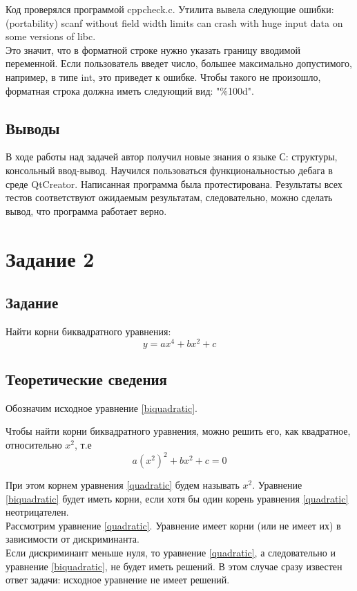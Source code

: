 \documentclass[12pt,a4paper]{report}
\begin{document}
Код проверялся программой cppcheck.c. Утилита вывела следующие ошибки: \\
(portability) scanf without field width limits can crash with huge input data on some versions of libc.\\
Это значит, что в форматной строке нужно указать границу вводимой переменной. Если пользователь введет число, большее максимально допустимого, например, в типе int, это приведет к ошибке. Чтобы такого не произошло, форматная строка должна иметь следующий вид: "\%100d".
\subsection{Выводы}
В ходе работы над задачей автор получил новые знания о языке С: структуры, консольный ввод-вывод. Научился пользоваться функциональностью дебага в среде QtCreator. Написанная программа была протестирована. Результаты всех тестов соответствуют ожидаемым результатам, следовательно, можно сделать вывод, что программа работает верно. 

\section{Задание 2}
\subsection{Задание}
Найти корни биквадратного уравнения: 
\begin{equation}
\label{biquadratic}
y = ax^{4} + bx^{2} + c
\end{equation}
\subsection{Теоретические сведения}
Обозначим исходное уравнение \ref{biquadratic}.

Чтобы найти корни биквадратного уравнения, можно решить его, как квадратное, относительно $x^{2}$, т.е
\begin{equation}
\label{quadratic}
  a(x^{2})^{2} + bx^{2} + c = 0
\end{equation}

При этом корнем уравнения \ref{quadratic} будем называть $x^{2}$.
Уравнение \ref{biquadratic} будет иметь корни, если хотя бы один корень уравнения \ref{quadratic} неотрицателен. \\
Рассмотрим уравнение \ref{quadratic}. Уравнение имеет корни (или не имеет их) в зависимости от дискриминанта. \\
Если дискриминант меньше нуля, то уравнение \ref{quadratic}, а следовательно и уравнение \ref{biquadratic}, не будет иметь решений. В этом случае сразу известен ответ задачи: исходное уравнение не имеет решений. \\
\end{document}
